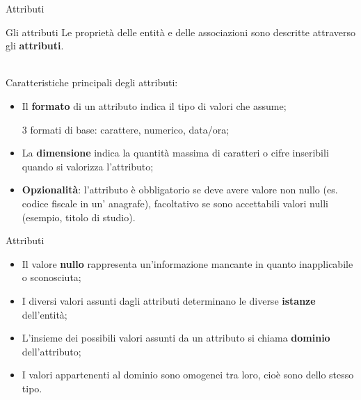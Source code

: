 %
\begin{frame}{Attributi}
\begin{minipage}{0.9\textwidth}
\begin{block}{Gli attributi}
Le propriet\`a delle entit\`a e delle associazioni sono descritte attraverso gli \textbf{attributi}.
\end{block}
\end{minipage}
\pause
\newline
\\Caratteristiche principali degli attributi:
\begin{itemize}[<+->]
    \item Il \textbf{formato} di un attributo indica il tipo di valori che assume;
    
    3 formati di base: carattere, numerico, data/ora;
    \item La \textbf{dimensione} indica la quantit\`a massima di caratteri o cifre inseribili quando si valorizza l'attributo;
    \item \textbf{Opzionalit\`a}: l'attributo \`e obbligatorio se deve avere valore non nullo (es. codice fiscale in un' anagrafe), facoltativo se sono accettabili valori nulli (esempio, titolo di studio).
\end{itemize}
\end{frame}
%
\begin{frame}{Attributi}
\begin{itemize}[<+->]
    \item Il valore \textbf{nullo} rappresenta un'informazione mancante in quanto inapplicabile o sconosciuta;
    \item I diversi valori assunti dagli attributi determinano le diverse \textbf{istanze} dell'entit\`a;
    \item L'insieme dei possibili valori assunti da un attributo si chiama  \textbf{dominio} dell'attributo;
    \item I valori appartenenti al dominio sono omogenei tra loro, cio\`e sono dello stesso tipo.
\end{itemize}
\end{frame}
%
